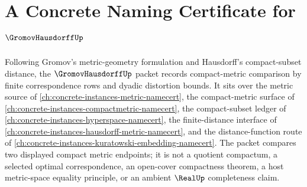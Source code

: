 \chapter{A Concrete Naming Certificate for $\GromovHausdorffUp$}
\label{ch:concrete-instances-gromov-hausdorff-namecert}

Following Gromov's metric-geometry formulation and Hausdorff's compact-subset distance, the $\GromovHausdorffUp$ packet records compact-metric comparison by finite correspondence rows and dyadic distortion bounds. It sits over the metric source of \autoref{ch:concrete-instances-metric-namecert}, the compact-metric surface of \autoref{ch:concrete-instances-compactmetric-namecert}, the compact-subset ledger of \autoref{ch:concrete-instances-hyperspace-namecert}, the finite-distance interface of \autoref{ch:concrete-instances-hausdorff-metric-namecert}, and the distance-function route of \autoref{ch:concrete-instances-kuratowski-embedding-namecert}. The packet compares two displayed compact metric endpoints; it is not a quotient compactum, a selected optimal correspondence, an open-cover compactness theorem, a host metric-space equality principle, or an ambient $\RealUp$ completeness claim.

